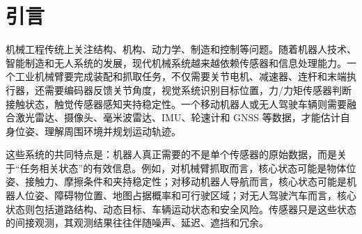\documentclass[UTF8,a4paper,12pt]{ctexart}
\begin{document}
\begin{abstract}
机器人是机械工程、控制工程、计算机科学和信息科学交叉形成的典型现代机械系统。与传统机械装置相比，机器人不仅要完成运动、承载和执行任务，还要通过视觉、激光雷达、惯性测量单元、力/力矩传感器、编码器、触觉阵列和电机电流等多源传感信息理解自身状态与外部环境。多传感器融合提高了机器人感知的完整性和鲁棒性，但也带来了数据冗余、通信带宽受限、计算负荷增加和不确定性累积等问题。因此，如何判断哪些传感器真正有价值、哪些信息是冗余的、传感数据经过压缩和传输后还保留多少有效信息，是机器人系统设计中的关键问题。

本文从信息理论角度讨论机器人多传感器数据融合问题。首先，利用熵、条件熵和互信息刻画机器人状态估计中的不确定性减少，将传感器价值解释为其对目标状态的平均信息增益；其次，引入条件互信息和数据处理定理，分析多传感器之间的冗余、互补和特征提取过程中的信息损失；再次，从信道容量和 AWGN 信道容量出发，讨论机器人无线通信、边缘计算和分布式传感网络的传输极限；最后，结合机械臂抓取、移动机器人导航和主动感知三个场景，说明信息理论如何指导传感器布置、数据压缩、传感器选择和感知动作决策。本文认为，机器人多传感器融合的核心不是简单堆叠更多传感器，而是在机械任务目标、传感器观测、通信链路和算法模型之间建立高效的信息流，使有限的感知资源最大化地降低机器人对状态和环境的不确定性。

\noindent\textbf{关键词：}信息理论；机械工程；机器人；多传感器融合；互信息；信息增益；信道容量；主动感知
\end{abstract}

\clearpage
\tableofcontents
\clearpage
{}

\section{引言}

机械工程传统上关注结构、机构、动力学、制造和控制等问题。随着机器人技术、智能制造和无人系统的发展，现代机械系统越来越依赖传感器和信息处理能力。一个工业机械臂要完成装配和抓取任务，不仅需要关节电机、减速器、连杆和末端执行器，还需要编码器反馈关节角度，视觉系统识别目标位置，力/力矩传感器判断接触状态，触觉传感器感知夹持稳定性。一个移动机器人或无人驾驶车辆则需要融合激光雷达、摄像头、毫米波雷达、IMU、轮速计和 GNSS 等数据，才能估计自身位姿、理解周围环境并规划运动轨迹。

这些系统的共同特点是：机器人真正需要的不是单个传感器的原始数据，而是关于“任务相关状态”的有效信息。例如，对机械臂抓取而言，核心状态可能是物体位姿、接触力、摩擦条件和夹持稳定性；对移动机器人导航而言，核心状态可能是机器人位姿、障碍物位置、地图占据概率和可行驶区域；对无人驾驶汽车而言，核心状态则包括道路结构、动态目标、车辆运动状态和安全风险。传感器只是这些状态的间接观测，其观测结果往往伴随噪声、延迟、遮挡和冗余。
\end{document}
